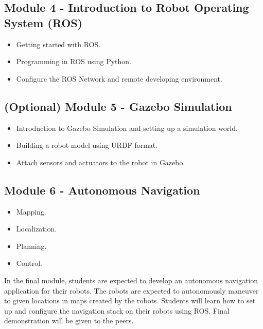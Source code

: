 \documentclass[11pt,letterpaper]{article}
\begin{document}
\subsection*{Module 4 - Introduction to Robot Operating System (ROS)}
\begin{itemize}
    \item Getting started with ROS.
    \item Programming in ROS using Python.
    \item Configure the ROS Network and remote developing environment.
\end{itemize}

\subsection*{(Optional) Module 5 - Gazebo Simulation}
\begin{itemize}
    \item Introduction to Gazebo Simulation and setting up a simulation world.
    \item Building a robot model using URDF format.
    \item Attach sensors and actuators to the robot in Gazebo.
\end{itemize}

\subsection*{Module 6 - Autonomous Navigation}
\begin{itemize}
    \item Mapping.
    \item Localization.
    \item Planning.
    \item Control.
\end{itemize}
In the final module, students are expected to develop an autonomous navigation application for their robots. The robots are expected to autonomously maneuver to given locations in maps created by the robots. Students will learn how to set up and configure the navigation stack on their robots using ROS. Final demonstration will be given to the peers.     
\end{document}
